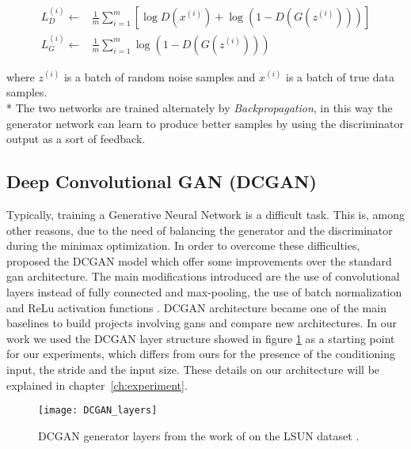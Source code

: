 \begin{equation}
\label{eq:ganloss}
\begin{split}
L_{D}^{(i)} \gets & \frac{1}{m} \sum_{i=1}^m \left[
\log D\left({x}^{(i)}\right)
+ \log \left(1-D\left(G\left({z}^{(i)}\right)\right)\right)
\right] \\
L_{G}^{(i)} \gets & \frac{1}{m} \sum_{i=1}^m
\log \left(1-D\left(G\left({z}^{(i)}\right)\right)\right)
\end{split}
\end{equation}

where ${z}^{(i)}$ is a batch of random noise samples and ${x}^{(i)}$ is a batch of true data samples. \\*
The two networks are trained alternately by \textit{Backpropagation}, in this way the generator network can learn to produce better samples by using the discriminator output as a sort of feedback. 

\subsection{Deep Convolutional GAN (DCGAN)}
Typically, training a Generative Neural Network is a difficult task. This is, among other reasons, due to the need of balancing the generator and the discriminator during the minimax optimization. In order to overcome these difficulties, \citeauthor{gan:dcgan} proposed the DCGAN model \cite{gan:dcgan} which offer some improvements over the standard \gls{gan} architecture. The main modifications introduced are the use of convolutional layers instead of fully connected and max-pooling, the use of batch normalization \cite{batchnorm} and ReLu activation functions \cite{relu}. DCGAN architecture became one of the main baselines to build projects involving \glspl{gan} and compare new architectures. In our work we used the DCGAN layer structure showed in figure \ref{fig:dcganlayers} as a starting point for our experiments, which differs from ours for the presence of the conditioning input, the stride and the input size. These details on our architecture will be explained in chapter~\ref{ch:experiment}.

\begin{figure}[h!]
	\begin{center}
		\texttt{[image: DCGAN\_layers]}
	\end{center}
	
	\captionsetup{width=1\linewidth}
	\caption[Layers  from DCGAN, \citeauthor{gan:dcgan}]{DCGAN generator layers from the work of \citeauthor{gan:dcgan} on the LSUN dataset \cite[p.4]{gan:dcgan}.}
	\label{fig:dcganlayers}
	\medskip
\end{figure}

